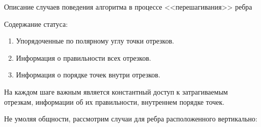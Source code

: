 \documentclass[letterpaper,12pt]{article}
\begin{document}
\begin{center}
Описание случаев поведения алгоритма в процессе <<перешагивания>> ребра
\end{center}
Содержание статуса: 
\begin{enumerate}
      \item Упорядоченные по полярному углу точки отрезков.
      \item Информация о правильности всех отрезков.
      \item Информация о порядке точек внутри отрезков.
\end{enumerate}

На каждом шаге важным является константный доступ к затрагиваемым
отрезкам, информации об их правильности, внутреннем порядке точек.

Не умоляя общности, рассмотрим случаи для ребра расположенного вертикально:
\end{document}
